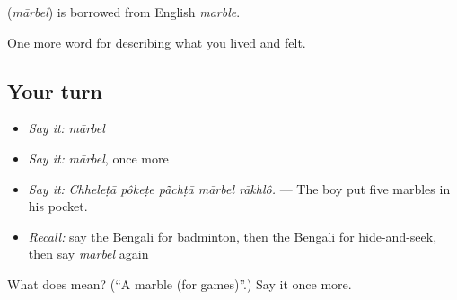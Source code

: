 \begin{cousinweb}
\textbf{} (\emph{mārbel}) is borrowed from English \emph{marble}.
\end{cousinweb}

\begin{grammarlens}[title={What you've built}]
One more word for describing what you lived and felt.
\end{grammarlens}

\subsection*{Your turn}
\begin{itemize}
\raggedright
  \item \emph{Say it:} \emph{mārbel}
  \item \emph{Say it:} \emph{mārbel}, once more
  \item \emph{Say it:} \emph{Chheleṭā pôkeṭe pā̃chṭā mārbel rākhlô.} — The boy put five marbles in his pocket.
  \item \emph{Recall:} say the Bengali for badminton, then the Bengali for hide-and-seek, then say \emph{mārbel} again
\end{itemize}

\begin{tcolorbox}[breakable,colback=teal!4,colframe=teal!35!black,title={Before you move on}]
What does  mean? (\textquotedblleft{}A marble (for games)\textquotedblright{}.) Say it once more.
\end{tcolorbox}
